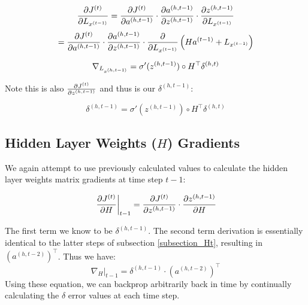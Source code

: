 \documentclass[]{article}
\newcommand{\deriv}[2]{%
	\ensuremath{\frac{\partial {#1}}{\partial {#2}}}}
\newcommand{\vlayer}[2]{ %
	\ensuremath{{#1}^{(#2)}}}
\begin{document}
$$\deriv{\vlayer{J}{t}}{L_{\vlayer{x}{t-1}}} = \deriv{\vlayer{J}{t}}{\vlayer{a}{h,t-1}}\cdot\deriv{\vlayer{a}{h, t-1}}{\vlayer{z}{h,t-1}}\cdot\deriv{\vlayer{z}{h, t-1}}{L_{\vlayer{x}{t-1}}}$$
$$= \deriv{\vlayer{J}{t}}{\vlayer{a}{h,t-1}}\cdot\deriv{\vlayer{a}{h, t-1}}{\vlayer{z}{h,t-1}}\cdot \deriv{}{L_{\vlayer{x}{t-1}}} \left(H\vlayer{a}{t-1} + L_{\vlayer{x}{t-1}}\right)$$

\begin{equation} \label{eq:h,t-1}
\nabla_{L_{\vlayer{x}{h,t-1}}}= \sigma'(\vlayer{z}{h,t-1}) \circ H^\top \vlayer{\delta}{h,t}\end{equation}

Note this is also $\deriv{\vlayer{J}{t}}{\vlayer{z}{h,t-1}}$ and thus is our \vlayer{\delta}{h,t-1}:

\begin{equation} \label{eq:delta,t-1}
\vlayer{\delta}{h,t-1}= \sigma'(\vlayer{z}{h,t-1}) \circ H^\top \vlayer{\delta}{h,t}\end{equation}

\subsection{Hidden Layer Weights ($H$) Gradients}
We again attempt to use previously calculated values to calculate the hidden layer weights matrix gradients at time step $t-1$:

$$\left. \deriv{\vlayer{J}{t}}{H}\right|_{t-1} = \deriv{\vlayer{J}{t}}{\vlayer{z}{h,t-1}}\cdot\deriv{\vlayer{z}{h,t-1}}{H}$$

The first term we know to be\vlayer{\delta}{h,t-1}. The second term derivation is essentially identical to the latter steps of subsection \ref{subsection_Ht}, resulting in $(\vlayer{a}{h,t-2})^\top$. Thus we have:
\begin{equation}
\left.\nabla_H\right|_{t-1} = \vlayer{\delta}{h,t-1} \cdot (\vlayer{a}{h,t-2})^\top
\end{equation}
Using these equation, we can backprop arbitrarily back in time by continually calculating the $\delta$ error values at each time step.
\end{document}
